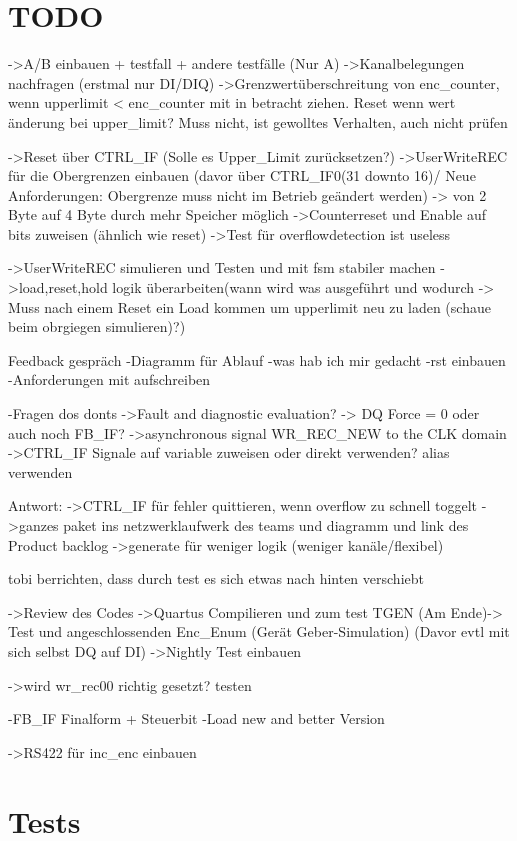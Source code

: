 \chapter{TODO}
->A/B einbauen + testfall + andere testfälle (Nur A)
->Kanalbelegungen nachfragen (erstmal nur DI/DIQ)
->Grenzwertüberschreitung von enc\_counter, wenn upperlimit < enc\_counter mit in betracht ziehen. Reset wenn wert änderung bei upper\_limit? Muss nicht, ist gewolltes Verhalten, auch nicht prüfen

->Reset über CTRL\_IF (Solle es Upper\_Limit zurücksetzen?)
->UserWriteREC für die Obergrenzen einbauen (davor über CTRL\_IF0(31 downto 16)/ Neue Anforderungen: Obergrenze muss nicht im Betrieb geändert werden) -> von 2 Byte auf 4 Byte durch mehr Speicher möglich
->Counterreset und Enable auf bits zuweisen (ähnlich wie reset)
->Test für overflowdetection ist useless

->UserWriteREC simulieren und Testen und mit fsm stabiler machen
->load,reset,hold logik überarbeiten(wann wird was ausgeführt und wodurch -> Muss nach einem Reset ein Load kommen um upperlimit neu zu laden (schaue beim obrgiegen simulieren)?)

Feedback gespräch
-Diagramm für Ablauf
-was hab ich mir gedacht
-rst einbauen
-Anforderungen mit aufschreiben

-Fragen dos donts
->Fault and diagnostic evaluation? -> DQ Force = 0 oder auch noch FB\_IF?
->asynchronous signal WR\_REC\_NEW to the CLK domain
->CTRL\_IF Signale auf variable zuweisen oder direkt verwenden? alias verwenden

Antwort:
->CTRL\_IF für fehler quittieren, wenn overflow zu schnell toggelt
->ganzes paket ins netzwerklaufwerk des teams und diagramm und link des Product backlog
->generate für weniger logik (weniger kanäle/flexibel)

tobi berrichten, dass durch test es sich etwas nach hinten verschiebt

->Review des Codes
->Quartus Compilieren und zum test 
TGEN (Am Ende)-> Test und angeschlossenden Enc\_Enum (Gerät Geber-Simulation) (Davor evtl mit sich selbst DQ auf DI)
->Nightly Test einbauen

->wird wr\_rec00 richtig gesetzt? testen

-FB\_IF Finalform + Steuerbit
-Load new and better Version

->RS422 für inc\_enc einbauen
\chapter{Tests}

